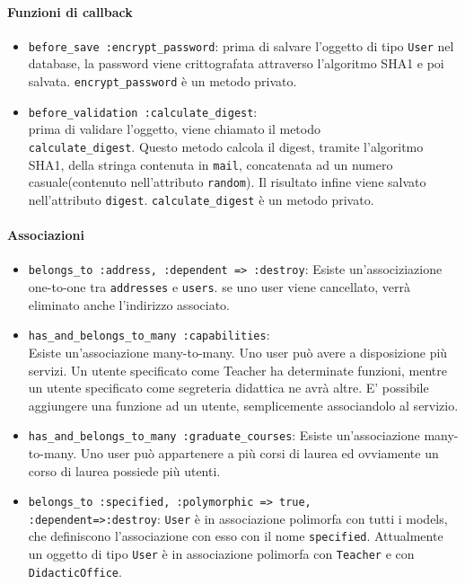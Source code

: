 \documentclass[11pt,a4paper]{article}
\begin{document}
\paragraph{Funzioni di callback}
\begin{itemize}
 \item \verb|before_save :encrypt_password|: prima di salvare l'oggetto di tipo \verb|User| nel database, la password viene crittografata attraverso l'algoritmo SHA1 e poi salvata. \verb|encrypt_password| è un metodo privato.
\item \verb|before_validation :calculate_digest|:\\
 prima di validare l'oggetto, viene chiamato il metodo\\ \verb|calculate_digest|. Questo metodo calcola il digest, tramite l'algoritmo SHA1, della stringa contenuta in \verb|mail|, concatenata ad un numero casuale(contenuto nell'attributo \verb|random|). Il risultato infine viene salvato nell'attributo \verb|digest|. \verb|calculate_digest| è un metodo privato.
\end{itemize}
\paragraph{Associazioni}
\begin{itemize}
 \item \verb|belongs_to :address, :dependent => :destroy|: Esiste un'associziazione one-to-one tra \verb|addresses| e \verb|users|. se uno user viene cancellato, verrà eliminato anche l'indirizzo associato.
\item \verb|has_and_belongs_to_many :capabilities|:\\ Esiste un'associazione many-to-many. Uno user può avere a disposizione più servizi. Un utente specificato come Teacher ha determinate funzioni, mentre un utente specificato come segreteria didattica ne avrà altre. E' possibile aggiungere una funzione ad un utente, semplicemente associandolo al servizio.
\item \verb|has_and_belongs_to_many :graduate_courses|: Esiste un'associazione many-to-many. Uno user può appartenere a più corsi di laurea ed ovviamente un corso di laurea possiede più utenti.
\item \verb|belongs_to :specified, :polymorphic => true,|\\
    \verb |:dependent=>:destroy|: \verb|User| è in associazione polimorfa con tutti i models, che definiscono l'associazione con esso con il nome \verb|specified|. Attualmente un oggetto di tipo \verb|User| è in associazione polimorfa con \verb|Teacher| e con \verb|DidacticOffice|.
\end{itemize}
\end{document}
